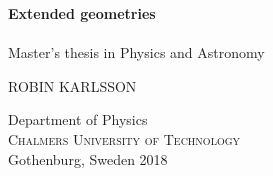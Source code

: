 
\begin{titlepage}
			
\addtolength{\voffset}{2cm}

\begin{figure}[H]
\centering
\vspace{2cm}	%
\end{figure}


\newcommand{\headtitle}{Extended geometries}
\newcommand{\subtitle}{Extensions of geometry motivated by the symmetries of string theory/M-theory}


\mbox{}
\vfill
\renewcommand{\familydefault}{\sfdefault} \normalfont %
\textbf{{\Huge 	\headtitle}} 	\\[0.5cm]
{\Large }\\[0.5cm]
Master's thesis in Physics and Astronomy \setlength{\parskip}{1cm}

{\Large ROBIN KARLSSON} \setlength{\parskip}{2.9cm}

Department of Physics \\
\textsc{Chalmers University of Technology} \\
Gothenburg, Sweden 2018

\renewcommand{\familydefault}{\rmdefault} \normalfont %
\end{titlepage}


\newpage
\restoregeometry
\thispagestyle{empty}
\mbox{}


